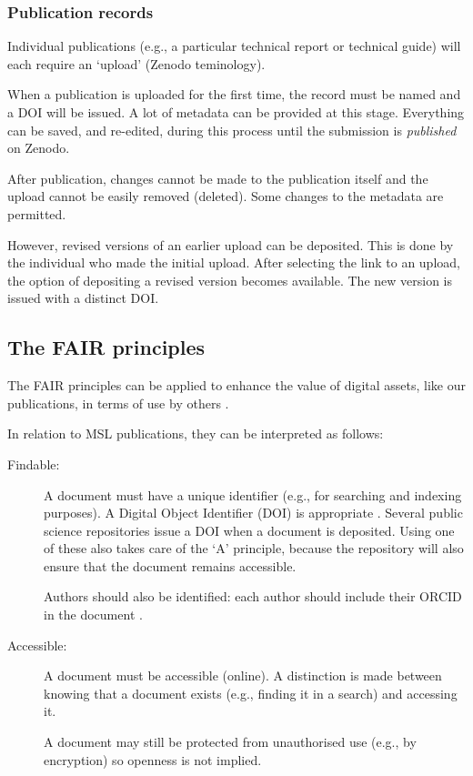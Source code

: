 {\subsubsection{Publication records}
Individual publications (e.g., a particular technical report or technical guide) will each require an `upload' (Zenodo teminology). 

When a publication is uploaded for the first time, the record must be named and a DOI will be issued. A lot of metadata can be provided at this stage. Everything can be saved, and re-edited,  during this process until the submission is \textit{published} on Zenodo. 

After publication, changes cannot be made to the publication itself and the upload cannot be easily removed (deleted). Some changes to the metadata are permitted. 

However, revised versions of an earlier upload can be deposited. This is done by the individual who made the initial upload. After selecting the link to an upload, the option of depositing a revised version becomes available. The new version is issued with a distinct DOI.    

\subsection{The FAIR principles}
The FAIR principles can be applied to enhance the value of digital assets, like our publications, in terms of use by others \cite{FAIR}. 

In relation to MSL publications, they can be interpreted as follows:
\begin{description}
	\item[Findable: ] A document must have a unique identifier (e.g., for searching and indexing purposes).  A Digital Object Identifier (DOI) is appropriate \cite{doi}. Several public science repositories issue a DOI when a document is deposited. Using one of these also takes care of the `A' principle, because the repository will also ensure that the document remains accessible.
	
	Authors should also be identified: each author should include their ORCID in the document \cite{orcid}.
	
	\item[Accessible: ] A document must be accessible (online). A distinction is made between knowing that a document exists (e.g., finding it in a search) and accessing it. 
	
	A document may still be protected from unauthorised use (e.g., by encryption) so openness is not implied.
	

\end{description}}

